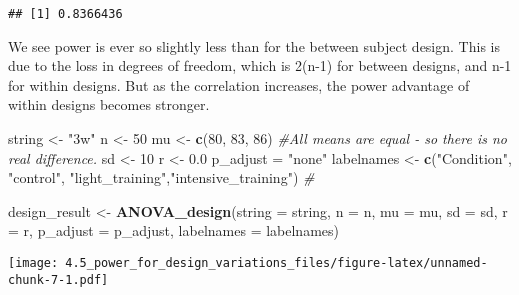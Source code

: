 \documentclass[]{article}
\newenvironment{Shaded}{\begin{snugshade}}{\end{snugshade}}
\newcommand{\KeywordTok}[1]{\textcolor[rgb]{0.13,0.29,0.53}{\textbf{#1}}}
\newcommand{\DataTypeTok}[1]{\textcolor[rgb]{0.13,0.29,0.53}{#1}}
\newcommand{\DecValTok}[1]{\textcolor[rgb]{0.00,0.00,0.81}{#1}}
\newcommand{\FloatTok}[1]{\textcolor[rgb]{0.00,0.00,0.81}{#1}}
\newcommand{\StringTok}[1]{\textcolor[rgb]{0.31,0.60,0.02}{#1}}
\newcommand{\CommentTok}[1]{\textcolor[rgb]{0.56,0.35,0.01}{\textit{#1}}}
\newcommand{\OperatorTok}[1]{\textcolor[rgb]{0.81,0.36,0.00}{\textbf{#1}}}
\newcommand{\NormalTok}[1]{#1}
\begin{document}
\begin{Shaded}
\end{Shaded}

\begin{verbatim}
## [1] 0.8366436
\end{verbatim}

We see power is ever so slightly less than for the between subject
design. This is due to the loss in degrees of freedom, which is 2(n-1)
for between designs, and n-1 for within designs. But as the correlation
increases, the power advantage of within designs becomes stronger.

\begin{Shaded}
\begin{Highlighting}[]
\NormalTok{string <-}\StringTok{ "3w"}
\NormalTok{n <-}\StringTok{ }\DecValTok{50}
\NormalTok{mu <-}\StringTok{ }\KeywordTok{c}\NormalTok{(}\DecValTok{80}\NormalTok{, }\DecValTok{83}\NormalTok{, }\DecValTok{86}\NormalTok{) }\CommentTok{#All means are equal - so there is no real difference.}
\NormalTok{sd <-}\StringTok{ }\DecValTok{10}
\NormalTok{r <-}\StringTok{ }\FloatTok{0.0}
\NormalTok{p_adjust =}\StringTok{ "none"}
\NormalTok{labelnames <-}\StringTok{ }\KeywordTok{c}\NormalTok{(}\StringTok{"Condition"}\NormalTok{, }\StringTok{"control"}\NormalTok{, }\StringTok{"light_training"}\NormalTok{,}\StringTok{"intensive_training"}\NormalTok{) }\CommentTok{#}

\NormalTok{design_result <-}\StringTok{ }\KeywordTok{ANOVA_design}\NormalTok{(}\DataTypeTok{string =}\NormalTok{ string,}
                   \DataTypeTok{n =}\NormalTok{ n, }
                   \DataTypeTok{mu =}\NormalTok{ mu, }
                   \DataTypeTok{sd =}\NormalTok{ sd, }
                   \DataTypeTok{r =}\NormalTok{ r, }
                   \DataTypeTok{p_adjust =}\NormalTok{ p_adjust,}
                   \DataTypeTok{labelnames =}\NormalTok{ labelnames)}
\end{Highlighting}
\end{Shaded}

\texttt{[image: 4.5\_power\_for\_design\_variations\_files/figure-latex/unnamed-chunk-7-1.pdf]}

\begin{Shaded}
\end{Shaded}
\end{document}
